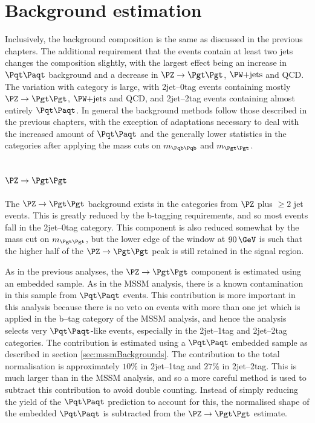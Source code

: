 \section{Background estimation}
\label{sec:Hhhbackgrounds}

Inclusively, the background composition is the same as discussed in the previous
chapters. The additional requirement that the events contain at least two jets
changes the composition slightly, with the largest effect being an increase in
$\ttbar$ background and a decrease in $\ZToTauTau$, $\WJets$ and QCD. The
variation with category is large, with 2jet--0tag events containing mostly
$\ZToTauTau$, $\WJets$ and QCD, and 2jet--2tag events containing almost entirely
$\ttbar$. In general the background methods follow those described in the
previous chapters, with the exception of adaptations necessary to deal with the
increased amount of $\ttbar$ and the generally lower statistics in the
categories after applying the mass cuts on $m_{\Pqb\Pqb}$ and $m_{\Pgt\Pgt}$.

\subsection{$\ZToTauTau$}

The $\ZToTauTau$ background exists in the categories from $\PZ$ plus $\geq 2$
jet events. This is greatly reduced by the b-tagging requirements, and so most
events fall in the 2jet--0tag category. This component is also reduced somewhat
by the mass cut on $m_{\Pgt\Pgt}$, but the lower edge of the window at $90\,\GeV$
is such that the higher half of the $\ZToTauTau$ peak is still retained in the
signal region.  

As in the previous analyses, the $\ZToTauTau$ component is estimated using an
embedded sample. As in the \ac{MSSM} analysis, there is a known contamination in
this sample from $\ttbar$ events. This contribution is more important in this
analysis because there is no veto on events with more than one jet which
is applied in the b--tag category of the \ac{MSSM} analysis, and 
hence the analysis selects very $\ttbar$-like events,
especially in the 2jet--1tag and 2jet--2tag categories. The contribution is
estimated using a $\ttbar$ embedded sample as described in section
\ref{sec:mssmBackgrounds}. The contribution to the total normalisation is
approximately $10\%$ in 2jet--1tag and $27\%$ in 2jet--2tag. This is much larger
than in the \ac{MSSM} analysis, and so a more careful method is used to subtract
this contribution to avoid double counting. Instead of simply reducing the yield
of the $\ttbar$ prediction to account for this, the normalised shape of the
embedded $\ttbar$ is subtracted from the $\ZToTauTau$ estimate.

